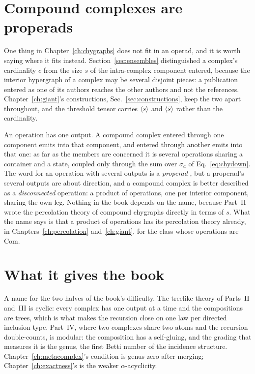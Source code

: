 \section{Compound complexes are properads}
\label{sec:op-properads}

One thing in Chapter~\ref{ch:chygraphs} does not fit in an operad, and it is
worth saying where it fits instead. Section~\ref{sec:ensembles} distinguished
a complex's cardinality $c$ from the size $s$ of the intra-complex component
entered, because the interior hypergraph of a complex may be several
disjoint pieces: a publication entered as one of its authors reaches the
other authors and not the references. Chapter~\ref{ch:giant}'s constructions,
Sec.~\ref{sec:constructions}, keep the two apart throughout, and the
threshold tensor carries $\langle s \rangle$ and $\langle \bar s \rangle$ rather than the
cardinality.

An operation has one output. A compound complex entered through one
component emits into that component, and entered through another emits into
that one: as far as the members are concerned it is several operations
sharing a container and a state, coupled only through the sum over
$\sigma_{a}$ of Eq.~\eqref{eq:chydown}. The word for an operation with
several outputs is a \emph{properad} \citep{vallette2007}, but a
properad's several outputs are about direction, and a compound complex is
better described as a \emph{disconnected} operation: a product of
operations, one per interior component, sharing the own leg. Nothing in the
book depends on the name, because Part~II wrote the percolation theory of
compound chygraphs directly in terms of $s$. What the name says is that a
product of operations has its percolation theory already, in
Chapters~\ref{ch:percolation} and~\ref{ch:giant}, for the class whose
operations are $\mathrm{Com}$.

\section{What it gives the book}
\label{sec:op-gives}

A name for the two halves of the book's difficulty. The treelike theory of
Parts~II and~III is cyclic: every complex has one output at a time and the
compositions are trees, which is what makes the recursion close on one law
per directed inclusion type. Part~IV, where two complexes share two atoms and
the recursion double-counts, is modular: the composition has a self-gluing,
and the grading that measures it is the genus, the first Betti number of the
incidence structure. Chapter~\ref{ch:metacomplex}'s condition is genus
zero after merging; Chapter~\ref{ch:exactness}'s is the weaker
$\alpha$-acyclicity.

